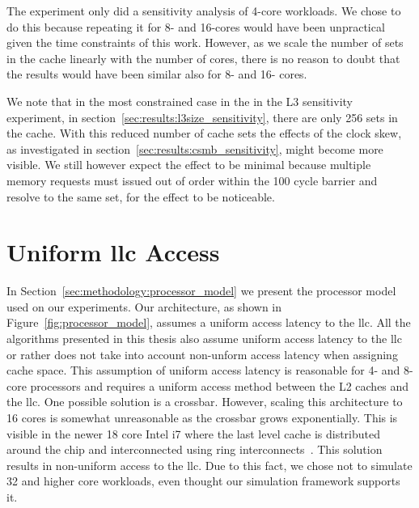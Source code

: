 The experiment only did a sensitivity analysis of 4-core workloads. 
We chose to do this because repeating it for 8- and 16-cores would have been unpractical given the time constraints of this work. 
However, as we scale the number of sets in the cache linearly with the number of cores, there is no reason to doubt that the results would have been similar also for 8- and 16- cores.

We note that in the most constrained case in the in the L3 sensitivity experiment, in section~\ref{sec:results:l3size_sensitivity}, there are only 256 sets in the cache.
With this reduced number of cache sets the effects of the clock skew, as investigated in section~\ref{sec:results:csmb_sensitivity}, might become more visible.
We still however expect the effect to be minimal because multiple memory requests must issued out of order within the 100 cycle barrier and resolve to the same set, for the effect to be noticeable.


\section{Uniform \gls{llc} Access}

In Section~\ref{sec:methodology:processor_model} we present the processor model used on our experiments.
Our architecture, as shown in Figure~\ref{fig:processor_model}, assumes a uniform access latency to the \gls{llc}.
All the algorithms presented in this thesis also assume uniform access latency to the \gls{llc} or rather does not take into account non-unform access latency when assigning cache space.
This assumption of uniform access latency is reasonable for 4- and 8-core processors and requires a uniform access method between the L2 caches and the \gls{llc}.
One possible solution is a crossbar.
However, scaling this architecture to 16 cores is somewhat unreasonable as the crossbar grows exponentially.
This is visible in the newer 18 core Intel i7 where the last level cache is distributed around the chip and interconnected using ring interconnects~\cite{Hruska2014}.
This solution results in non-uniform access to the \gls{llc}.
Due to this fact, we chose not to simulate 32 and higher core workloads, even thought our simulation framework supports it.